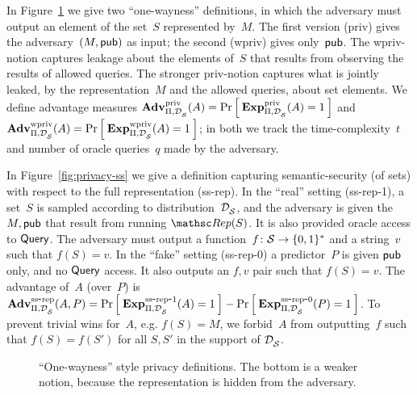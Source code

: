 In Figure~\ref{fig:privacy-ow} we give two ``one-wayness''
definitions, in which the adversary must output an element of the
set~$S$ represented by~$M$.  The first version (priv) gives the
adversary~$(M,{\sf pub})$ as input; the second (wpriv) gives
only~${\sf pub}$.  The wpriv-notion captures leakage about the elements
of~$S$ that results from observing the results of allowed queries.
The stronger priv-notion captures what is jointly leaked, by the
representation~$M$ and the allowed queries, about set elements.  We
define advantage measures $\mathrm{\mathbf{Adv}}^{\mathrm{priv}}_{\Pi,\mathcal{D}_{{\cal S}}^{}}(A) =
\Pr\left[\: \mathrm{\mathbf{Exp}}^{\mathrm{priv}}_{\Pi,\mathcal{D}_{{\cal S}}^{}}(A)=1 \:\right]$ and $\mathrm{\mathbf{Adv}}^{\mathrm{wpriv}}_{\Pi,\mathcal{D}_{{\cal S}}^{}}(A) =
\Pr\left[\: \mathrm{\mathbf{Exp}}^{\mathrm{wpriv}}_{\Pi,\mathcal{D}_{{\cal S}}^{}}(A)=1 \:\right]$; in both we track the
time-complexity~$t$ and number of oracle queries~$q$ made by the adversary.

In Figure~\ref{fig:privacy-ss} we give a definition capturing semantic-security (of sets)
with respect to the full representation (ss-rep).  In the ``real''
setting (ss-rep-1), a set~$S$ is sampled according to distribution~$\mathcal{D}_{{\cal S}}^{}$,
and the adversary is given the~$M,{\sf pub}$ that result from running
$\Rep(S)$.  It is also provided oracle access to $\mathsf{Query}$.
The adversary must output a function~$f\colon{\cal S} \to \{0,1\}^*$ and a
string~$v$ such that $f(S)=v$.  In the ``fake'' setting (ss-rep-0) a
predictor~$P$ is given ${\sf pub}$ only, and no $\mathsf{Query}$ access.  It
also outputs an $f,v$ pair such that $f(S)=v$.  The advantage of~$A$ (over~$P$)
is $\mathrm{\mathbf{Adv}}^{\mathrm{ss\mbox{-}rep}}_{\Pi,\mathcal{D}_{{\cal S}}^{}}(A,P) =
\Pr\left[\: \mathrm{\mathbf{Exp}}^{\mathrm{ss\mbox{-}rep\mbox{-}1}}_{\Pi,\mathcal{D}_{{\cal S}}^{}}(A)=1 \:\right] -
\Pr\left[\: \mathrm{\mathbf{Exp}}^{\mathrm{ss\mbox{-}rep\mbox{-}0}}_{\Pi,\mathcal{D}_{{\cal S}}^{}}(P)=1 \:\right]$.  To prevent trivial wins
for~$A$, e.g. $f(S)=M$, we forbid~$A$ from outputting~$f$
such that $f(S)=f(S')$ for all $S,S'$ in the support of $\mathcal{D}_{{\cal S}}^{}$.


\begin{figure}[htbp]
\centering
{}
\caption{``One-wayness'' style privacy
  definitions. The bottom is a weaker notion, because the representation
  is hidden from the adversary.} 
\label{fig:privacy-ow}
\end{figure}

